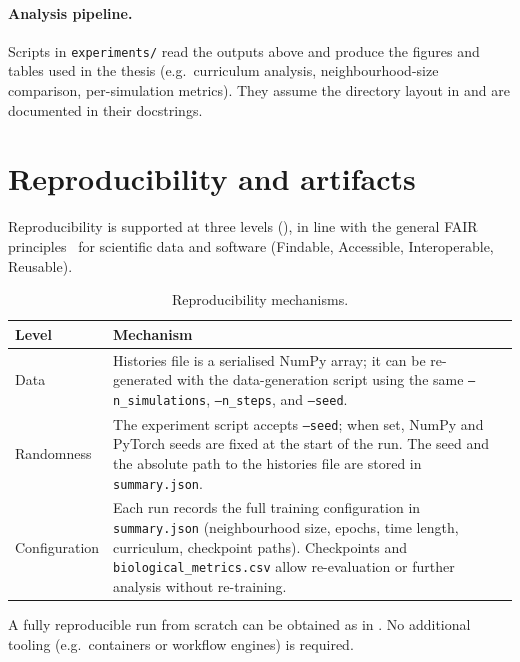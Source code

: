 \paragraph{Analysis pipeline.}
Scripts in \texttt{experiments/} read the outputs above and produce the figures and tables used in the thesis (e.g.\ curriculum analysis, neighbourhood-size comparison, per-simulation metrics).
They assume the directory layout in  and are documented in their docstrings.

\section{Reproducibility and artifacts}

Reproducibility is supported at three levels (), in line with the general FAIR principles~\cite{wilkinson2016fair} for scientific data and software (Findable, Accessible, Interoperable, Reusable).

\begin{table}[htbp]
  \centering
  \caption{Reproducibility mechanisms.}
  \label{tab:tools:repro}
  \begin{tabular}{@{}p{2.4cm}p{9.6cm}@{}}
    \hline
    \textbf{Level} & \textbf{Mechanism} \\
    \hline
    Data & Histories file is a serialised NumPy array; it can be re-generated with the data-generation script using the same \texttt{--n\_simulations}, \texttt{--n\_steps}, and \texttt{--seed}. \\
    \hline
    Randomness & The experiment script accepts \texttt{--seed}; when set, NumPy and PyTorch seeds are fixed at the start of the run. The seed and the absolute path to the histories file are stored in \texttt{summary.json}. \\
    \hline
    Configuration & Each run records the full training configuration in \texttt{summary.json} (neighbourhood size, epochs, time length, curriculum, checkpoint paths). Checkpoints and \texttt{biological\_metrics.csv} allow re-evaluation or further analysis without re-training. \\
    \hline
  \end{tabular}
\end{table}

A fully reproducible run from scratch can be obtained as in .
No additional tooling (e.g.\ containers or workflow engines) is required.

